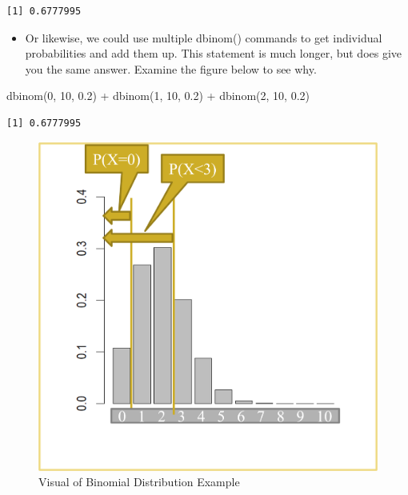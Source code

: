 \documentclass[
  letterpaper,
  DIV=11,
  numbers=noendperiod]{scrreprt}
\newenvironment{Shaded}{\begin{snugshade}}{\end{snugshade}}
\newcommand{\DecValTok}[1]{\textcolor[rgb]{0.68,0.00,0.00}{#1}}
\newcommand{\FloatTok}[1]{\textcolor[rgb]{0.68,0.00,0.00}{#1}}
\newcommand{\FunctionTok}[1]{\textcolor[rgb]{0.28,0.35,0.67}{#1}}
\newcommand{\NormalTok}[1]{\textcolor[rgb]{0.00,0.23,0.31}{#1}}
\newcommand{\SpecialCharTok}[1]{\textcolor[rgb]{0.37,0.37,0.37}{#1}}
\providecommand{\tightlist}{%
  \setlength{\itemsep}{0pt}\setlength{\parskip}{0pt}}\usepackage{longtable,booktabs,array}
\begin{document}
\begin{verbatim}
[1] 0.6777995
\end{verbatim}

\begin{itemize}
\tightlist
\item
  Or likewise, we could use multiple dbinom() commands to get individual
  probabilities and add them up. This statement is much longer, but does
  give you the same answer. Examine the figure below to see why.
\end{itemize}

\begin{Shaded}
\begin{Highlighting}[]
\FunctionTok{dbinom}\NormalTok{(}\DecValTok{0}\NormalTok{, }\DecValTok{10}\NormalTok{, }\FloatTok{0.2}\NormalTok{) }\SpecialCharTok{+} \FunctionTok{dbinom}\NormalTok{(}\DecValTok{1}\NormalTok{, }\DecValTok{10}\NormalTok{, }\FloatTok{0.2}\NormalTok{) }\SpecialCharTok{+} \FunctionTok{dbinom}\NormalTok{(}\DecValTok{2}\NormalTok{, }\DecValTok{10}\NormalTok{, }\FloatTok{0.2}\NormalTok{)}
\end{Highlighting}
\end{Shaded}

\begin{verbatim}
[1] 0.6777995
\end{verbatim}

\begin{figure}[H]

{\centering \includegraphics{Pictures/Ch4/HistEx.png}

}

\caption{Visual of Binomial Distribution Example}

\end{figure}%
\end{document}
